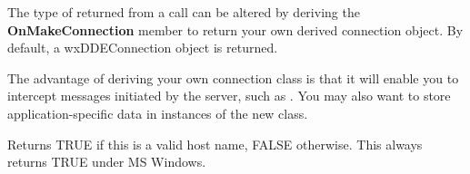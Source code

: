 \label{wxddeclientonmakeconnection}


The type of  returned from a  call can
be altered by deriving the {\bf OnMakeConnection} member to return your
own derived connection object. By default, a wxDDEConnection
object is returned.

The advantage of deriving your own connection class is that it will
enable you to intercept messages initiated by the server, such
as . You may also want to
store application-specific data in instances of the new class.



Returns TRUE if this is a valid host name, FALSE otherwise. This always
returns TRUE under MS Windows.


